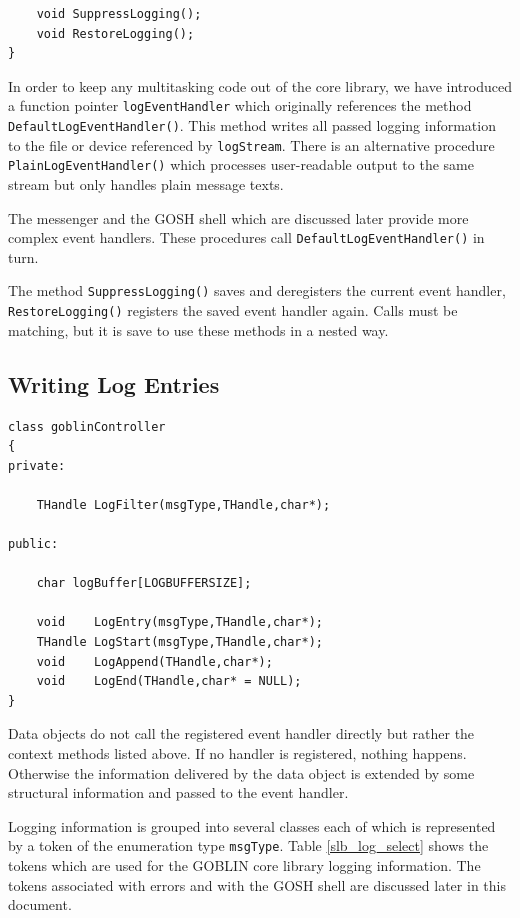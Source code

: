 \documentclass[a4paper,11pt,twoside]{book}
\begin{document}
\begin{multicols}{2}
\begin{mymethods}
\begin{verbatim}
    void SuppressLogging();
    void RestoreLogging();
}
\end{verbatim}
\end{mymethods}
In order to keep any multitasking code out of the core library, we have
introduced a function pointer \verb/logEventHandler/ which originally
references the method \verb/DefaultLogEventHandler()/. This method writes
all passed logging information to the file or device referenced by
\verb/logStream/. There is an alternative procedure
\verb/PlainLogEventHandler()/ which processes user-readable output to the
same stream but only handles plain message texts.

The messenger and the GOSH shell which are discussed later provide more complex
event handlers. These procedures call \verb/DefaultLogEventHandler()/ in turn.

The method \verb/SuppressLogging()/ saves and deregisters the current event
handler, \verb/RestoreLogging()/ registers the saved event handler again.
Calls must be matching, but it is save to use these methods in a nested way.


\subsection{Writing Log Entries}
\begin{mymethods}
\begin{verbatim}
class goblinController
{
private:

    THandle LogFilter(msgType,THandle,char*);

public:

    char logBuffer[LOGBUFFERSIZE];

    void    LogEntry(msgType,THandle,char*);
    THandle LogStart(msgType,THandle,char*);
    void    LogAppend(THandle,char*);
    void    LogEnd(THandle,char* = NULL);
}
\end{verbatim}
\end{mymethods}
Data objects do not call the registered event handler directly but rather
the context methods listed above. If no handler is registered, nothing happens.
Otherwise the information delivered by the data object is extended by some
structural information and passed to the event handler.

Logging information is grouped into several classes each of which is
represented by a token of the enumeration type \verb/msgType/. Table
\ref{slb_log_select} shows the tokens which are used for the GOBLIN core
library logging information. The tokens associated with errors and with the
GOSH shell are discussed later in this document.


\end{multicols}
\end{document}
